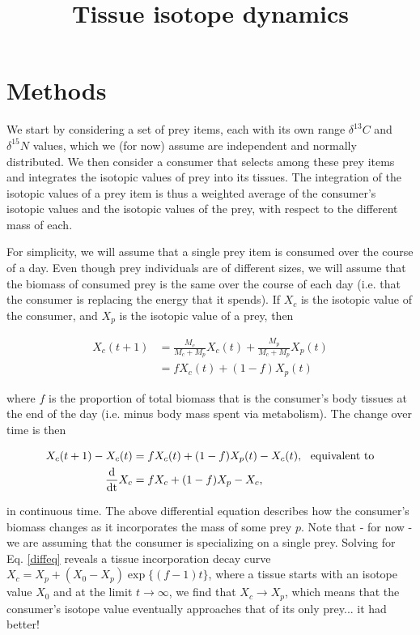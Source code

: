 \documentclass[11pt]{article}
\begin{document}
\title{Tissue isotope dynamics}

\maketitle

\section{Methods}
We start by considering a set of prey items, each with its own range $\delta^{13}C$ and $\delta^{15}N$ values, which we (for now) assume are independent and normally distributed.
We then consider a consumer that selects among these prey items and integrates the isotopic values of prey into its tissues.
The integration of the isotopic values of a prey item is thus a weighted average of the consumer's isotopic values and the isotopic values of the prey, with respect to the different mass of each.

For simplicity, we will assume that a single prey item is consumed over the course of a day.
Even though prey individuals are of different sizes, we will assume that the biomass of consumed prey is the same over the course of each day (i.e. that the consumer is replacing the energy that it spends). 
If $X_c$ is the isotopic value of the consumer, and $X_p$ is the isotopic value of a prey, then

\begin{align}
	X_c(t+1) &= \frac{M_c}{M_c + M_p}X_c(t) + \frac{M_p}{M_c + M_p}X_p(t) \\ \nonumber
	&= fX_c(t) + (1-f)X_p(t)
\end{align}

\noindent where $f$ is the proportion of total biomass that is the consumer's body tissues at the end of the day (i.e. minus body mass spent via metabolism).
The change over time is then

\begin{align}
\label{diffeq}
	X_c(t+1) - X_c(t) &= fX_c(t) + (1-f)X_p(t) - X_c(t),~~\mbox{equivalent to} \\
	\frac{\rm d}{\rm dt}X_c &= fX_c + (1-f)X_p - X_c,
\end{align}

\noindent in continuous time. 
The above differential equation describes how the consumer's biomass changes as it incorporates the mass of some prey $p$.
Note that - for now - we are assuming that the consumer is specializing on a single prey.
Solving for Eq. \ref{diffeq} reveals a tissue incorporation decay curve $X_c = X_p + (X_0-X_p)\exp\{(f-1)t\}$, where a tissue starts with an isotope value $X_0$ and at the limit $t\rightarrow \infty $, we find that $X_c \rightarrow X_p$, which means that the consumer's isotope value eventually approaches that of its only prey... it had better!
\end{document}
